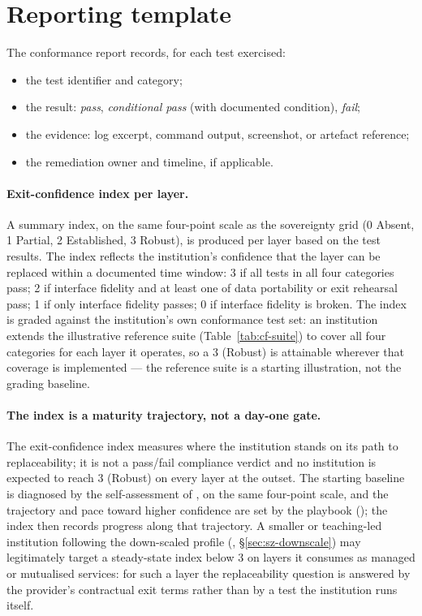 \section{Reporting template}
\label{sec:cf-reporting}

The conformance report records, for each test exercised:

\begin{itemize}[leftmargin=1.5em,nosep]
  \item the test identifier and category;
  \item the result: \emph{pass}, \emph{conditional pass} (with
    documented condition), \emph{fail};
  \item the evidence: log excerpt, command output, screenshot, or
    artefact reference;
  \item the remediation owner and timeline, if applicable.
\end{itemize}

\paragraph{Exit-confidence index per layer.} A summary index, on the
same four-point scale as the sovereignty grid (0 Absent, 1 Partial,
2 Established, 3 Robust), is produced per layer based on the test
results. The index reflects the institution's confidence that the
layer can be replaced within a documented time window: 3 if all
tests in all four categories pass; 2 if interface fidelity and at
least one of data portability or exit rehearsal pass; 1 if only
interface fidelity passes; 0 if interface fidelity is broken.
The index is graded against the institution's own conformance test
set: an institution extends the illustrative reference suite
(Table~\ref{tab:cf-suite}) to cover all four categories for each
layer it operates, so a 3 (Robust) is attainable wherever that
coverage is implemented --- the reference suite is a starting
illustration, not the grading baseline.

\paragraph{The index is a maturity trajectory, not a day-one gate.}
The exit-confidence index measures where the institution stands on its
path to replaceability; it is not a pass/fail compliance verdict and
no institution is expected to reach 3 (Robust) on every layer at the
outset. The starting baseline is diagnosed by the self-assessment of
, on the same four-point scale, and the
trajectory and pace toward higher confidence are set by the playbook
(); the index then records progress
along that trajectory. A smaller or teaching-led institution following
the down-scaled profile (,
\S\ref{sec:sz-downscale}) may legitimately target a steady-state index
below 3 on layers it consumes as managed or mutualised services: for
such a layer the replaceability question is answered by the provider's
contractual exit terms rather than by a test the institution runs
itself.

